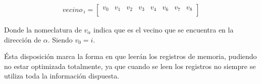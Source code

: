 \begin{align*}
	vecino_{\>i} =
	\begin{bmatrix}
	v_0 & v_1 & v_2 & v_3 & v_4 & v_6 & v_7 & v_8 \\
	\end{bmatrix}
\end{align*}

Donde la nomeclatura de $v_\alpha$ indica que es el vecino que se encuentra en la dirección de $\alpha$. Siendo $v_0 = i$.

Ésta disposición marca la forma en que leerán los registros de memoria, pudiendo no estar optimizada totalmente, ya que cuando se leen los registros no siempre se utiliza toda la información dispuesta.


